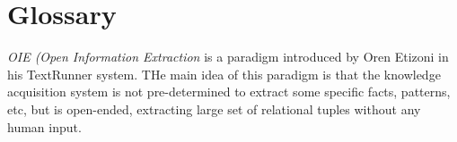 % 
\chapter{Glossary}

\emph{OIE (Open Information Extraction} is a paradigm introduced by Oren Etizoni in his TextRunner system. THe main idea of this paradigm is that the knowledge acquisition system is not pre-determined to extract some specific facts, patterns, etc, but is open-ended, extracting large set of relational tuples without any human input.\\
